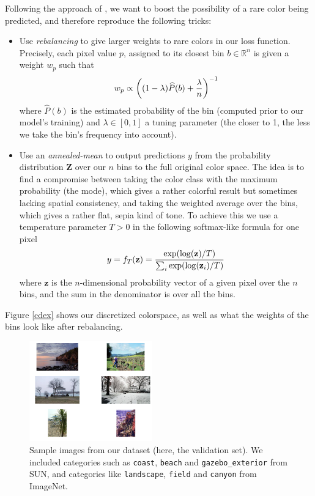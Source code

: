 \documentclass[10pt,twocolumn,letterpaper]{article}
\begin{document}
Following the approach of \cite{zhang2016colorful}, we want to boost the possibility of a rare color being predicted, and therefore reproduce the following tricks:
\begin{itemize}
\item Use \textit{rebalancing} to give larger weights to rare colors in our loss function. Precisely, each pixel value $p$, assigned to its closest bin $b \in \mathbb{R}^n$ is given a weight $w_p$ such that $$w_p \propto \left( (1-\lambda) \widehat{P}(b) + {\lambda \over n} \right)^{-1}$$ where $\widehat{P}(b)$ is the estimated probability of the bin (computed prior to our model's training) and $\lambda \in [0,1]$ a tuning parameter (the closer to 1, the less we take the bin's frequency into account).
\item Use an \textit{annealed-mean} to output predictions $y$ from the probability distribution $\textbf{Z}$ over our $n$ bins to the full original color space. The idea is to find a compromise between taking the color class with the maximum probability (the mode), which gives a rather colorful result but sometimes lacking spatial consistency, and taking the weighted average over the bins, which gives a rather flat, sepia kind of tone. To achieve this we use a temperature parameter $T > 0$ in the following softmax-like formula for one pixel $$y = f_T(\textbf{z}) = {\exp(\log(\textbf{z}) / T) \over \sum_i \exp(\log(\textbf{z}_i) / T)}$$ where $\textbf{z}$ is the $n$-dimensional probability vector of a given pixel over the $n$ bins, and the sum in the denominator is over all the bins.
\end{itemize}



Figure \ref{cdex} shows our discretized colorspace, as well as what the weights of the bins look like after rebalancing.
\begin{figure}
\begin{center}
\includegraphics[width=200px]{sampletrain.png}
\caption{Sample images from our dataset (here, the validation set). We included categories such as \texttt{coast}, \texttt{beach} and \texttt{gazebo\_exterior} from SUN, and categories like \texttt{landscape}, \texttt{field} and \texttt{canyon} from ImageNet.}
\label{sampletrain}
\end{center}
\end{figure}
\end{document}
